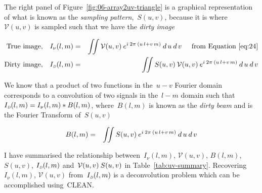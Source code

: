 The right panel of Figure~\ref{fig:06-array2uv-triangle} is a graphical representation of what is known as the \emph{sampling pattern},~$S(u, v)$, because it is where~$\mathcal{V}(u, v)$ is sampled such that we have the \emph{dirty image}

\begin{eqnarray}
  \label{eq:28}
   \mbox{True image,} \quad I_\nu (l, m) &=& \iint \mathcal{V}(u, v) \msp e^{ i \msp 2\pi \msp (u\,l + v\,m)} \msp d\,u \msp d\,v \hspace{0.5cm} \mbox{from Equation~\eqref{eq:24}} \nonumber \\
   \mbox{Dirty image,} \quad I_{\mbox{\tiny{\emph{D}}}} (l, m) &=& \iint S(u, v) \msp \mathcal{V}(u, v) \msp e^{ i \msp 2\pi \msp (u\,l + v\,m)} \msp d\,u \msp d\,v
\end{eqnarray}

We know that a product of two functions in the~$u-v$ Fourier domain corresponds to a convolution of two signals in the~$l-m$ domain such that~$I_{\mbox{\tiny{\emph{D}}}} (l, m) = I_\nu (l,m) * B(l,m)$, where~$B(l,m)$ is known as the \emph{dirty beam} and is the Fourier Transform of~$S(u, v)$

\begin{eqnarray}
  \label{eq:29}
  B(l,m) &=& \iint S(u, v) \msp e^{ i \msp 2\pi \msp (u\,l + v\,m)} \msp d\,u \msp d\,v \nonumber
\end{eqnarray}

I have summarised the relationship between~$I_\nu (l, m)$, $\mathcal{V}(u,  v)$, $B(l, m)$, $S(u, v)$, $I_{\mbox{\tiny{\emph{D}}}}(l, m)$ and~$\mathcal{V}(u,  v) \msp S(u, v)$ in Table~\ref{tab:uv-summary}. Recovering~$I_\nu (l, m)$, $\mathcal{V}(u,  v)$ from~$I_{\mbox{\tiny{\emph{D}}}}(l, m)$ is a deconvolution problem which can be accomplished using~CLEAN.

